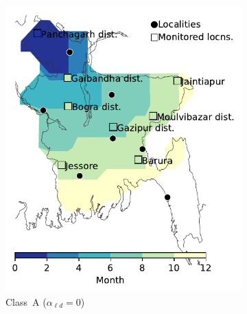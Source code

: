 \documentclass[11pt]{article}
\newcommand{\asd}{\alpha_s}
\newcommand{\afm}{\alpha_{\ell}}
\newcommand{\ald}{\alpha_{\ell d}}
\newcommand{\mooreRange}{r_\mathrm{M}}
\theoremstyle{definition}
\begin{document}
\begin{figure}[!ht]
    \centering
\begin{subfigure}[b]{.4\textwidth}
    \includegraphics[width=\textwidth]{../cellular_automata/results/contour/BGD_model-A.pdf}
    \caption{Class~A ($\ald=0$) \label{fig:bgdClassA}}
\end{subfigure}\hspace{.5cm}
\begin{subfigure}[b]{.4\textwidth}

\end{subfigure}
\end{figure}
\end{document}
